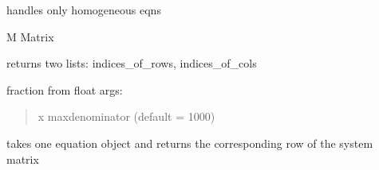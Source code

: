 \documentclass[letterpaper,10pt,english]{sphinxmanual}
\begin{document}

\begin{fulllineitems}
\label{pycontroltools:auxfuncs.math.miscmath.extract_independent_eqns}
handles only homogeneous eqns

M Matrix

returns two lists: indices\_of\_rows, indices\_of\_cols

\end{fulllineitems}


\begin{fulllineitems}
\label{pycontroltools:auxfuncs.math.miscmath.fractionfromfloat}
fraction from float
args:
\begin{quote}

x
maxdenominator (default = 1000)
\end{quote}

\end{fulllineitems}


\begin{fulllineitems}
\label{pycontroltools:auxfuncs.math.miscmath.get_coeff_row}
takes one equation object and returns the corresponding row of
the system matrix

\end{fulllineitems}

\end{document}
